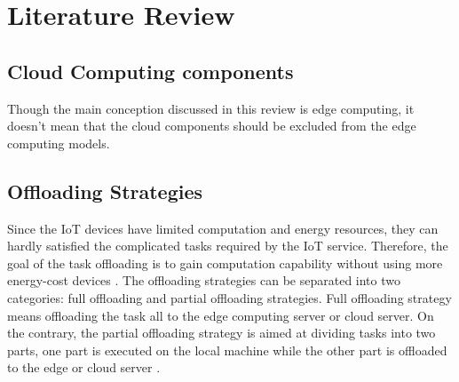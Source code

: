 \documentclass[a4paper,11pt]{article}
\begin{document}






\section{Literature Review}
\subsection{Cloud Computing components}
Though the main conception discussed in this review is edge computing, it doesn't mean that the cloud components should be excluded from the edge computing models. 

\subsection{Offloading Strategies}
Since the IoT devices have limited computation and energy resources, they can hardly satisfied the complicated tasks required by the IoT service. Therefore, the goal of the task offloading is to gain computation capability without using more energy-cost devices \cite{aim_offloading}. The offloading strategies can be separated into two categories: full offloading and partial offloading strategies. Full offloading strategy means offloading the task all to the edge computing server or cloud server. On the contrary, the partial offloading strategy is aimed at dividing tasks into two parts, one part is executed on the local machine while the other part is offloaded to the edge or cloud server \cite{full_partial}. 
\end{document}
